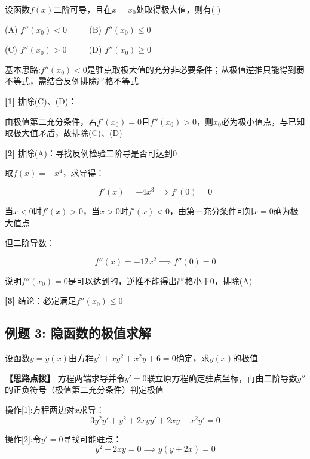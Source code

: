 \documentclass[11pt,a4paper,UTF8]{ctexart}
\begin{document}
设函数$f(x)$二阶可导，且在$x = x_0$处取得极大值，则有( )

(A) $f''(x_0) < 0$ $\qquad$ (B) $f''(x_0) \le 0$

(C) $f''(x_0) > 0$ $\qquad$ (D) $f''(x_0) \ge 0$

基本思路:$f''(x_0) < 0$是驻点取极大值的充分非必要条件；从极值逆推只能得到弱不等式，需结合反例排除严格不等式

\begin{solbox}[分步推导与答题规范]
\textbf{[1]} 排除(C)、(D)：

由极值第二充分条件，若$f'(x_0) = 0$且$f''(x_0) > 0$，则$x_0$必为极小值点，与已知取极大值矛盾，故排除(C)、(D)

\textbf{[2]} 排除(A)：寻找反例检验二阶导是否可达到0

取$f(x) = -x^4$，求导得：


\begin{equation*}
f'(x) = -4x^3 \implies f'(0) = 0
\end{equation*}


当$x < 0$时$f'(x) > 0$，当$x > 0$时$f'(x) < 0$，由第一充分条件可知$x = 0$确为极大值点

但二阶导数：


\begin{equation*}
f''(x) = -12x^2 \implies f''(0) = 0
\end{equation*}


说明$f''(x_0) = 0$是可以达到的，逆推不能得出严格小于0，排除(A)

\textbf{[3]} 结论：必定满足$f''(x_0) \le 0$
\end{solbox}


\subsection{例题 3: 隐函数的极值求解}

设函数$y = y(x)$由方程$y^3 + xy^2 + x^2y + 6 = 0$确定，求$y(x)$的极值

\textbf{\color{DeepPurple}【思路点拨】} 方程两端求导并令$y' = 0$联立原方程确定驻点坐标，再由二阶导数$y''$的正负符号（极值第二充分条件）判定极值


操作[1]:方程两边对$x$求导：
\begin{equation*}
3y^2y' + y^2 + 2xyy' + 2xy + x^2y' = 0
\end{equation*}


操作[2]:令$y' = 0$寻找可能驻点：
\begin{equation*}
y^2 + 2xy = 0 \implies y(y + 2x) = 0
\end{equation*}
\end{document}
